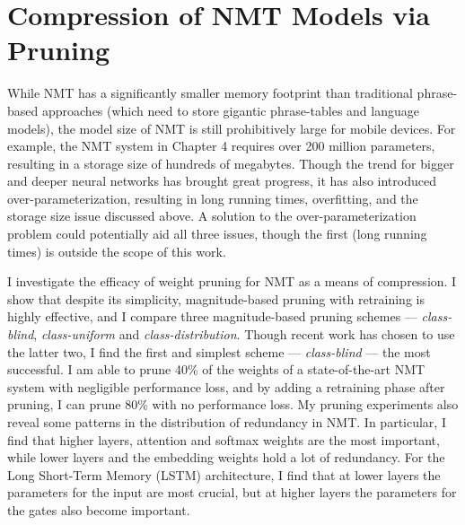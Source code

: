 \section{Compression of NMT Models via Pruning}
\label{sec:nmt-compression}
While NMT has a significantly smaller memory footprint than traditional phrase-based approaches (which need to store gigantic phrase-tables and
language models), the model size of NMT is still prohibitively large for mobile devices.
For example, the NMT system in Chapter 4 \cite{luong15attn}requires over 200 million
parameters, resulting in a storage size of hundreds of megabytes. 
Though the trend for bigger and deeper neural networks has brought great progress, it has also introduced over-parameterization, resulting in long running times, overfitting, and the storage size issue discussed above. 
A solution to the over-parameterization problem could potentially aid all three issues, though the first (long running times) is outside the scope of this work.

I investigate the efficacy of weight pruning for NMT as a means of compression.
I show that despite its simplicity, magnitude-based pruning with retraining is highly effective, and I compare three magnitude-based pruning schemes --- \textit{class-blind}, \textit{class-uniform} and \textit{class-distribution}.
Though recent work has chosen to use the latter two, I find the first and simplest scheme --- \textit{class-blind} --- the most successful.
I am able to prune 40\% of the weights of a state-of-the-art NMT system with negligible performance loss, and by adding a retraining phase after pruning, I can prune 80\% with no performance loss.
My pruning experiments also reveal some patterns in the distribution of
redundancy in NMT. In particular, I find that higher layers, attention and softmax weights are the most important, while lower layers and the embedding weights hold a lot of redundancy. 
For the Long Short-Term Memory (LSTM) architecture, I find that at lower layers the parameters for the input are most crucial, but at higher layers the parameters for the gates also become important.

